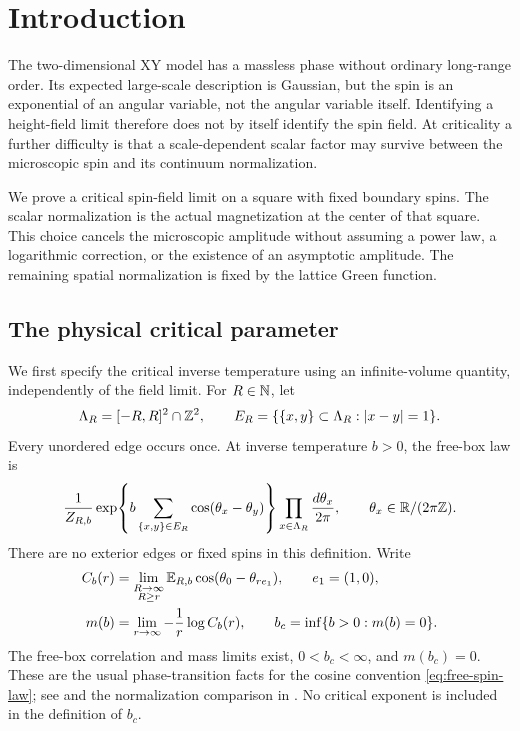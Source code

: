 \section{Introduction}\label{sec:intro}

The two-dimensional XY model has a massless phase without ordinary
long-range order. Its expected large-scale description is Gaussian, but
the spin is an exponential of an angular variable, not the angular
variable itself. Identifying a height-field limit therefore does not by
itself identify the spin field. At criticality a further difficulty is
that a scale-dependent scalar factor may survive between the microscopic
spin and its continuum normalization.

We prove a critical spin-field limit on a square with fixed boundary
spins. The scalar normalization is the actual magnetization at the
center of that square. This choice cancels the microscopic amplitude
without assuming a power law, a logarithmic correction, or the existence
of an asymptotic amplitude. The remaining spatial normalization is fixed
by the lattice Green function.

\subsection{The physical critical parameter}

We first specify the critical inverse temperature using an infinite-volume
quantity, independently of the field limit. For \(R\in\mathbb N\), let
\[
 \Lambda_R=[-R,R]^2\cap\mathbb Z^2,\qquad
 E_R=\{\{x,y\}\subset\Lambda_R:|x-y|=1\}.
\]
Every unordered edge occurs once. At inverse temperature \(b>0\), the
free-box law is
\begin{equation}\label{eq:free-spin-law}
 \frac1{Z_{R,b}}
 \exp\!\left\{b\sum_{\{x,y\}\in E_R}\cos(\theta_x-\theta_y)\right\}
 \prod_{x\in\Lambda_R}\frac{d\theta_x}{2\pi},
 \qquad \theta_x\in\mathbb R/(2\pi\mathbb Z).
\end{equation}
There are no exterior edges or fixed spins in this definition. Write
\begin{equation}\label{eq:critical-parameter}
 \begin{split}
 C_b(r)&=\lim_{\substack{R\to\infty\\R\ge r}}
       \mathbb E_{R,b}\cos(\theta_0-\theta_{re_1}),\qquad e_1=(1,0),\\
 m(b)&=\lim_{r\to\infty}-\frac1r\log C_b(r),\qquad
 b_c=\inf\{b>0:m(b)=0\}.
 \end{split}
\end{equation}
The free-box correlation and mass limits exist,
\(0<b_c<\infty\), and \(m(b_c)=0\). These are the usual
phase-transition facts for the cosine convention
\eqref{eq:free-spin-law}; see \cite[Theorem 1]{vEL} and the
normalization comparison in \cite[Proposition~1.2]{C}. No critical exponent is included
in the definition of \(b_c\).

